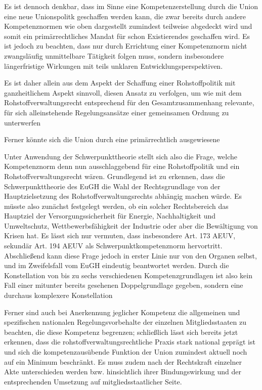 \documentclass[12pt,a4paper,oneside]{book} %
\begin{document}
	Es ist dennoch denkbar, dass im Sinne eine Kompetenzerstellung durch die Union eine neue Unionspolitk geschaffen werden kann, die zwar bereits durch andere Kompetenznormen wie oben dargestellt zumindest teilweise abgedeckt wird und somit ein primärrechtliches Mandat für schon Existierendes geschaffen wird. Es ist jedoch zu beachten, dass nur durch Errichtung einer Kompetenznorm nicht zwangsläufig unmittelbare Tätigkeit folgen muss, sondern insbesondere längerfristige Wirkungen mit teils unklaren Entwicklungsperspektiven.\autocite[siehe hierzu Nettesheim Art. 194 En 40]{grabitz_recht_2024}
	
	Es ist daher allein aus dem Aspekt der Schaffung einer Rohstoffpolitik mit ganzheitlichem Aspekt sinnvoll, diesen Ansatz zu verfolgen, um wie mit dem Rohstoffverwaltungsrecht entsprechend für den Gesamtzusammenhang relevante, für sich alleinstehende Regelungsansätze einer gemeinsamen Ordnung zu unterwerfen
	
	Ferner könnte sich die Union durch eine primärrechtlich ausgewiesene
	
	Unter Anwendung der Schwerpunkttheorie stellt sich also die Frage, welche Kompetenznorm denn nun ausschlaggebend für eine Rohstoffpolitik und ein Rohstoffverwaltungsrecht wären. Grundlegend ist zu erkennen, dass die Schwerpunkttheorie des EuGH die Wahl der Rechtsgrundlage von der Hauptzielsetzung des Rohstoffverwaltungsrechts abhängig machen würde. Es müsste also zunächst festgelegt werden, ob ein solcher Rechtsbereich das Hauptziel der Versorgungssicherheit für Energie, Nachhaltigkeit und Umweltschutz, Wettbewerbsfähigkeit der Industrie oder aber die Bewältigung von Krisen hat. Es lässt sich nur vermuten, dass insbesondere Art. 173 AEUV, sekundär Art. 194 AEUV als Schwerpunktkompetenznorm hervortritt. Abschließend kann diese Frage jedoch in erster Linie nur von den Organen selbst, und im Zweifelsfall vom EuGH eindeutig beantwortet werden. Durch die Konstellation von bis zu sechs verschiedenen Kompetenzgrundlagen ist also kein Fall einer mitunter bereits gesehenen Doppelgrundlage gegeben, sondern eine durchaus komplexere Konstellation
	
	Ferner sind auch bei Anerkennung jeglicher Kompetenz die allgemeinen und spezifischen nationalen Regelungsvorbehalte der einzelnen Mitgliedsstaaten zu beachten, die diese Kompetenz begrenzen; schließlich lässt sich bereits jetzt erkennen, dass die rohstoffverwaltungsrechtliche Praxis stark national geprägt ist und sich die kompetenzausübende Funktion der Union zumindest aktuell noch auf ein Minimum beschränkt. Es muss zudem nach der Rechtskraft einzelner Akte unterschieden werden bzw. hinsichtlich ihrer Bindungswirkung und der entsprechenden Umsetzung auf mitgliedsstaatlicher Seite.
	
\end{document}
